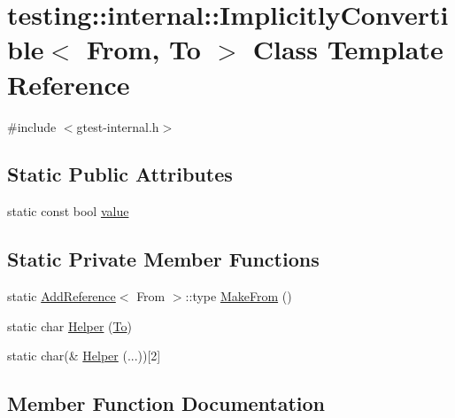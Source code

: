 \hypertarget{classtesting_1_1internal_1_1_implicitly_convertible}{}\section{testing\+::internal\+::Implicitly\+Convertible$<$ From, To $>$ Class Template Reference}
\label{classtesting_1_1internal_1_1_implicitly_convertible}


{\ttfamily \#include $<$gtest-\/internal.\+h$>$}

\subsection*{Static Public Attributes}
\begin{DoxyCompactItemize}
\item 
static const bool \mbox{\hyperlink{classtesting_1_1internal_1_1_implicitly_convertible_aea51cecabca681fb75659e224771b7b7}{value}}
\end{DoxyCompactItemize}
\subsection*{Static Private Member Functions}
\begin{DoxyCompactItemize}
\item 
static \mbox{\hyperlink{structtesting_1_1internal_1_1_add_reference}{Add\+Reference}}$<$ From $>$\+::type \mbox{\hyperlink{classtesting_1_1internal_1_1_implicitly_convertible_adb692b091aebd0cde316c8c2c0ab661f}{Make\+From}} ()
\item 
static char \mbox{\hyperlink{classtesting_1_1internal_1_1_implicitly_convertible_a20029a4415e5f9ae152b8fce8b124980}{Helper}} (\mbox{\hyperlink{classtesting_1_1internal_1_1_to}{To}})
\item 
static char(\& \mbox{\hyperlink{classtesting_1_1internal_1_1_implicitly_convertible_aba219f30a4cbba407d8141ce53fbfeb7}{Helper}} (...))\mbox{[}2\mbox{]}
\end{DoxyCompactItemize}


\subsection{Member Function Documentation}
\mbox{\label{classtesting_1_1internal_1_1_implicitly_convertible_a20029a4415e5f9ae152b8fce8b124980}} 
